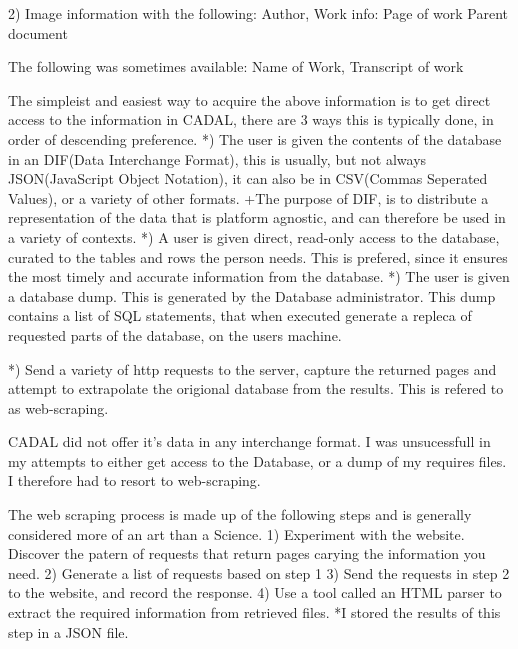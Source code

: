         2)  Image information with the following:
            Author,
            Work info:
                Page of work
                Parent document
            
            The following was sometimes available:
                Name of Work,
                Transcript of work
                
            The simpleist and easiest way to acquire the above information is to get direct access to the information in CADAL, there are 3 ways this is typically done, in order of descending preference.
            *)  The user is given the contents of the database in an DIF(Data Interchange Format), this is usually, but not always JSON(JavaScript Object Notation), it can also be in CSV(Commas Seperated Values), or a variety of other formats.
                +The purpose of DIF, is to distribute a representation of the data that is platform agnostic, and can  therefore be used in a variety of contexts.
            *)  A user is given direct, read-only access to the database, curated to the tables and rows the person needs.  This is prefered, since it ensures the most timely and accurate information from the database.
            *)  The user is given a database dump.  This is generated by the Database administrator.  This dump contains a list of SQL statements, that when executed generate a repleca of requested parts of the database, on the users machine.

            *)  Send a variety of http requests to the server, capture the returned pages and attempt to extrapolate the origional database from the results.  This is refered to as web-scraping.
            
            CADAL did not offer it's data in any interchange format.  I was unsucessfull in my attempts to either get access to the Database, or a dump of my requires files.  I therefore had to resort to web-scraping.
            
            The web scraping process is made up of the following steps and is generally considered more of an art than a Science.
                1)  Experiment with the website.  Discover the patern of requests that return pages carying the information you need.
                2)  Generate a list of requests based on step 1
                3)  Send the requests in step 2 to the website, and record the response.
                4)  Use a tool called an HTML parser to extract the required information from retrieved files.
                    *I stored the results of this step in a JSON file.
                
